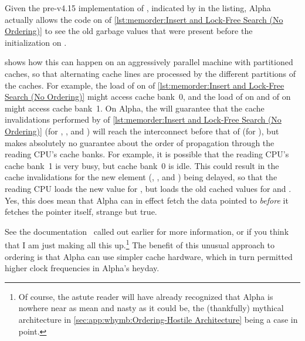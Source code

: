 \begin{fcvref}
Given the pre-v4.15 implementation of , indicated by
 in the listing, Alpha actually allows the code on
 of
\cref{lst:memorder:Insert and Lock-Free Search (No Ordering)}
to see the old garbage values that were present before the initialization
on .

shows how this can happen on
an aggressively parallel machine with partitioned caches, so that
alternating cache lines are processed by the different partitions
of the caches.
For example, the load of  on  of
\cref{lst:memorder:Insert and Lock-Free Search (No Ordering)}
might access cache bank~0,
and the load of  on  and of  on 
might access cache bank~1.
On Alpha, the  will guarantee that the cache
invalidations performed by  of
\cref{lst:memorder:Insert and Lock-Free Search (No Ordering)}
(for , , and ) will reach
the interconnect before that of  (for ), but
makes absolutely no guarantee about the order of
propagation through the reading CPU's cache banks.
For example, it is possible that the reading CPU's cache bank~1 is very
busy, but cache bank~0 is idle.
This could result in the cache invalidations for the new element
(, , and ) being
delayed, so that the reading CPU loads the new value for ,
but loads the old cached values for  and .
Yes, this does mean that Alpha can in effect fetch
the data pointed to {\em before} it fetches the pointer itself, strange
but true.
\end{fcvref}
See the documentation~\cite{Compaq01,WilliamPugh2000Gharachorloo}
called out earlier for more information,
or if you think that I am just making all this up.\footnote{
	Of course, the astute reader will have already recognized that
	Alpha is nowhere near as mean and nasty as it could be,
	the (thankfully) mythical architecture in
	\cref{sec:app:whymb:Ordering-Hostile Architecture}
	being a case in point.}
The benefit of this unusual approach to ordering is that Alpha can use
simpler cache hardware, which in turn permitted higher clock frequencies
in Alpha's heyday.

